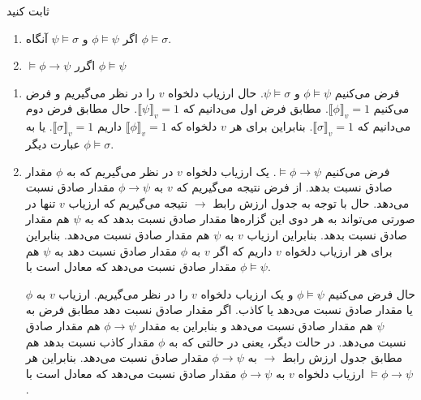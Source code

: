 ثابت کنید
\begin{enumerate}[label=(\alph*)]
\item
اگر
$\phi\models\psi$
و
$\psi\models\sigma$
آنگاه
$\phi\models\sigma$.

\item
$\models\phi\to\psi$
اگرر
$\phi\models\psi$
\end{enumerate}\quad\vspace{-9mm}
\begin{ans}
\begin{enumerate}[label=(\alph*)]
\item
فرض می‌کنیم $\phi\models\psi$
و
$\psi\models\sigma$.
حال ارزیاب دلخواه $v$ را در نظر می‌گیریم و فرض می‌کنیم $\llbracket\phi\rrbracket_v=1$. مطابق فرض اول می‌دانیم که
$\llbracket\psi\rrbracket_v=1$. حال مطابق فرض دوم می‌دانیم که
$\llbracket\sigma\rrbracket_v=1$.
بنابراین برای هر $v$ دلخواه که $\llbracket\phi\rrbracket_v=1$ داریم
$\llbracket\sigma\rrbracket_v=1$.
یا به عبارت دیگر
$\phi\models\sigma$.
\item
فرض می‌کنیم $\models\phi\to\psi$. یک ارزیاب دلخواه $v$ در نظر می‌گیریم که به $\phi$ مقدار صادق نسبت بدهد. از فرض نتیجه می‌گیریم که $v$ به $\phi\to\psi$ مقدار صادق نسبت می‌دهد. حال با توجه به جدول ارزش رابط $\to$ نتیجه می‌گیریم که ارزیاب $v$ تنها در صورتی می‌تواند به هر دوی این گزاره‌ها مقدار صادق نسبت بدهد که به $\psi$ هم مقدار صادق نسبت بدهد. بنابراین ارزیاب $v$ به $\psi$ هم مقدار صادق نسبت می‌دهد. بنابراین برای هر ارزیاب دلخواه $v$ داریم که اگر $v$ به $\phi$ مقدار صادق نسبت دهد به $\psi$ هم مقدار صادق نسبت می‌دهد که معادل است با $\phi\models\psi$.

حال فرض می‌کنیم
$\phi\models\psi$
و یک ارزیاب دلخواه $v$ را در نظر می‌گیریم. ارزیاب $v$ به $\phi$ یا مقدار صادق نسبت می‌دهد یا کاذب. اگر مقدار صادق نسبت دهد مطابق فرض به $\psi$ هم مقدار صادق نسبت می‌دهد و بنابراین به مقدار $\phi\to\psi$ هم مقدار صادق نسبت می‌دهد. در حالت دیگر، یعنی در حالتی که به $\phi$ مقدار کاذب نسبت بدهد هم مطابق جدول ارزش رابط $\to$ به $\phi\to\psi$ مقدار صادق نسبت می‌دهد. بنابراین هر ارزیاب دلخواه $v$ به $\phi\to\psi$ مقدار صادق نسبت می‌دهد که معادل است با $\models\phi\to\psi$.
\end{enumerate}
\end{ans}
